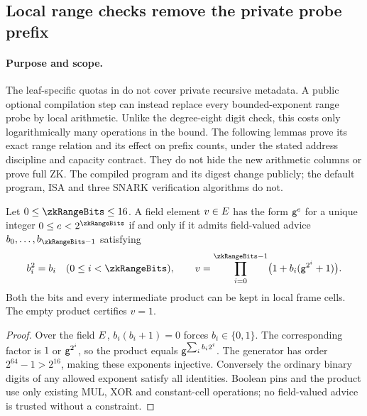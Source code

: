 \subsection{Local range checks remove the private probe prefix}\label{note:zk-local-ranges}

\paragraph{Purpose and scope.} The leaf-specific quotas in  do not cover private recursive metadata. A public optional compilation step can instead replace every bounded-exponent range probe by local arithmetic. Unlike the degree-eight digit check, this costs only logarithmically many operations in the bound. The following lemmas prove its exact range relation and its effect on prefix counts, under the stated address discipline and capacity contract. They do not hide the new arithmetic columns or prove full ZK. The compiled program and its digest change publicly; the default program, ISA and three SNARK verification algorithms do not.

\begin{lemma}\label{lem:zk-local-exponent}
Let $0\le\zkRangeBits\le16$. A field element $v\in E$ has the form $\mathsf{g}^e$ for a unique integer $0\le e<2^{\zkRangeBits}$ if and only if it admits field-valued advice $b_0,\ldots,b_{\zkRangeBits-1}$ satisfying
\[
 b_i^2=b_i\quad(0\le i<\zkRangeBits),
 \qquad v=\prod_{i=0}^{\zkRangeBits-1}
       \bigl(1+b_i(\gen^{2^i}+1)\bigr).
\]
Both the bits and every intermediate product can be kept in local frame cells. The empty product certifies $v=1$.
\end{lemma}
\begin{proof}
Over the field $E$, $b_i(b_i+1)=0$ forces $b_i\in\{0,1\}$. The corresponding factor is $1$ or $\mathsf{g}^{2^i}$, so the product equals $\mathsf{g}^{\sum_i b_i2^i}$. The generator has order $2^{64}-1>2^{16}$, making these exponents injective. Conversely the ordinary binary digits of any allowed exponent satisfy all identities. Boolean pins and the product use only existing MUL, XOR and constant-cell operations; no field-valued advice is trusted without a constraint.
\end{proof}

